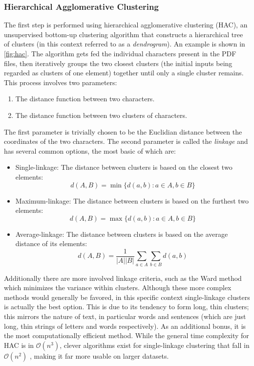 \subsubsection{Hierarchical Agglomerative Clustering}
The first step is performed using hierarchical agglomerative clustering (HAC),
an unsupervised bottom-up clustering algorithm that constructs a hierarchical
tree of clusters (in this context referred to as a \emph{dendrogram}). An
example is shown in \cref{fig:hac}. The algorithm gets fed the individual
characters present in the PDF files, then iteratively groups the two closest
clusters (the initial inputs being regarded as clusters of one element) together
until only a single cluster remains. This process involves two parameters:
\begin{enumerate}
\item The distance function between two characters.
\item The distance function between two clusters of characters.
\end{enumerate}
The first parameter is trivially chosen to be the Euclidian distance between the
coordinates of the two characters. The second parameter is called the
\emph{linkage} and has several common options, the most basic of which are:
\begin{itemize}
\item Single-linkage: The distance between clusters is based on the closest two
  elements: \[ d(A, B) = \min \{ d(a, b) : a \in A, b \in B \} \]
\item Maximum-linkage: The distance between clusters is based on the furthest two
  elements: \[ d(A, B) = \max \{ d(a, b) : a \in A, b \in B \} \]
\item Average-linkage: The distance between clusters is based on the average
  distance of its elements:
  \[ d(A, B) = \frac{1}{|A||B|} \sum_{a \in A}\sum_{b \in B} d(a, b) \]
\end{itemize}
Additionally there are more involved linkage criteria, such as the Ward method
which minimizes the variance within clusters. Although these more complex
methods would generally be favored, in this specific context single-linkage
clusters is actually the best option\citep{klampfl2014unsupervised}. This is due
to its tendency to form long, thin clusters; this mirrors the nature of text, in
particular words and sentences (which are just long, thin strings of letters and
words respectively).
As an additional bonus, it is the most computationally efficient method.
While the general time complexity for HAC is
in $\mathcal{O}(n^3)$, clever algorithms exist for single-linkage clustering
that fall in $\mathcal{O}(n^2)$ \citep{sibson1973slink}, making it far more
usable on larger datasets.

